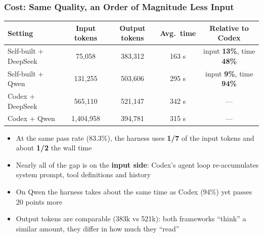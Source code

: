 \documentclass[10pt,aspectratio=169]{beamer}
\begin{document}
\begin{frame}
  \frametitle{Cost: Same Quality, an Order of Magnitude Less Input}

  \centering
  \small
  \setlength{\tabcolsep}{6pt}
  \renewcommand{\arraystretch}{1.2}
  \begin{tabular}{lcccc}
    \hline
    Setting & Input tokens & Output tokens & Avg.\ time & Relative to Codex \\
    \hline
    Self-built + DeepSeek & 75,058    & 383,312 & 163 s & input \textbf{13\%}, time \textbf{48\%} \\
    Self-built + Qwen     & 131,255   & 503,606 & 295 s & input \textbf{9\%}, time \textbf{94\%} \\
    Codex + DeepSeek      & 565,110   & 521,147 & 342 s & --- \\
    Codex + Qwen          & 1,404,958 & 394,781 & 315 s & --- \\
    \hline
  \end{tabular}

  \vspace{2.5mm}
  \begin{itemize}
    \item At the same pass rate (83.3\%), the harness uses \textbf{1/7} of the
          input tokens and about \textbf{1/2} the wall time
    \item Nearly all of the gap is on the \textbf{input side}: Codex's agent loop
          re-accumulates system prompt, tool definitions and history
    \item On Qwen the harness takes about the same time as Codex (94\%)
          yet passes 20 points more
    \item Output tokens are comparable (383k vs 521k): both frameworks ``think''
          a similar amount, they differ in how much they ``read''
  \end{itemize}
\end{frame}
\end{document}
